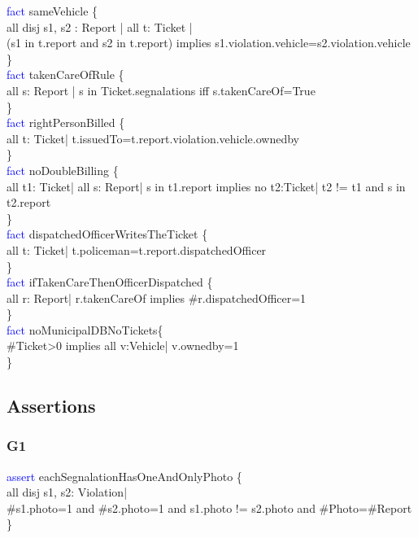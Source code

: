 \textcolor{blue}{fact}
\textcolor{mycolor}{sameVehicle} \{\\
all disj s1, s2 : Report | all t: Ticket |\\
(s1 in t.report and s2 in t.report) implies s1.violation.vehicle=s2.violation.vehicle\\
\}\\
\textcolor{blue}{fact}
\textcolor{mycolor}{takenCareOfRule} \{\\
all s: Report |
s in Ticket.segnalations iff s.takenCareOf=True\\
\}\\
\textcolor{blue}{fact}
\textcolor{mycolor}{rightPersonBilled} \{\\
all t: Ticket| t.issuedTo=t.report.violation.vehicle.ownedby\\
\}\\
\textcolor{blue}{fact}
\textcolor{mycolor}{noDoubleBilling} \{\\
all t1: Ticket| all s: Report|
s in t1.report implies no t2:Ticket| t2 != t1 and s in t2.report\\
\}\\
\textcolor{blue}{fact}
\textcolor{mycolor}{dispatchedOfficerWritesTheTicket} \{\\
all t: Ticket| t.policeman=t.report.dispatchedOfficer\\
\}\\
\textcolor{blue}{fact}
\textcolor{mycolor}{ifTakenCareThenOfficerDispatched} \{\\
all r: Report| r.takenCareOf implies \#r.dispatchedOfficer=1\\ 
\}\\
\textcolor{blue}{fact}
\textcolor{mycolor}{noMunicipalDBNoTickets}\{\\
\#Ticket>0 implies all v:Vehicle| v.ownedby=1\\
\}\\
\subsection{Assertions}
\subsubsection{G1}
\textcolor{blue}{assert}
\textcolor{mycolor}{eachSegnalationHasOneAndOnlyPhoto} \{\\
all disj s1, s2: Violation|\\ 
\#s1.photo=1 and \#s2.photo=1 and s1.photo != s2.photo
and \#Photo=\#Report\\
\}\\
